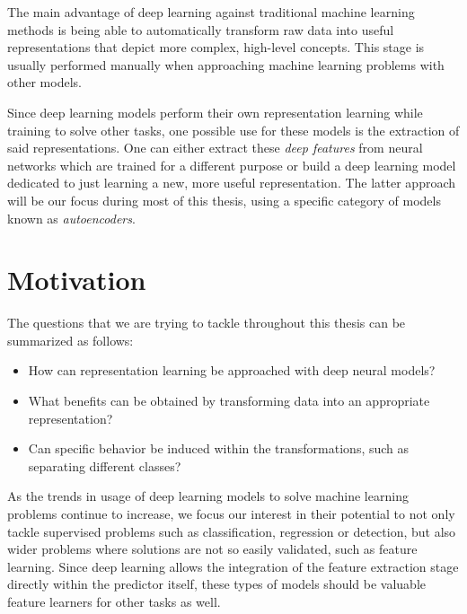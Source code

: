 The main advantage of deep learning against traditional machine learning methods is being able to automatically transform raw data into useful representations that depict more complex, high-level concepts. This stage is usually performed manually when approaching machine learning problems with other models.

Since deep learning models perform their own representation learning while training to solve other tasks, one possible use for these models is the extraction of said representations. One can either extract these \textit{deep features} from neural networks which are trained for a different purpose or build a deep learning model dedicated to just learning a new, more useful representation. The latter approach will be our focus during most of this thesis, using a specific category of models known as \textit{autoencoders}.

\section{Motivation}

The questions that we are trying to tackle throughout this thesis can be summarized as follows:

\begin{itemize}
    \item How can representation learning be approached with deep neural models?
    \item What benefits can be obtained by transforming data into an appropriate representation?
    \item Can specific behavior be induced within the transformations, such as separating different classes?
\end{itemize}



As the trends in usage of deep learning models to solve machine learning problems continue to increase, we focus our interest in their potential to not only tackle supervised problems such as classification, regression or detection, but also wider problems where solutions are not so easily validated, such as feature learning. Since deep learning allows the integration of the feature extraction stage directly within the predictor itself, these types of models should be valuable feature learners for other tasks as well.


